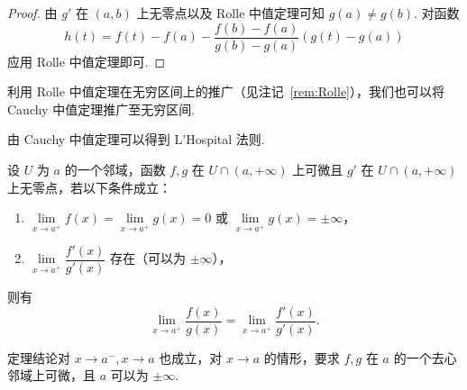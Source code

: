 \documentclass[../main.tex]{subfiles}
\begin{document}
\begin{proof}
    由 $g'$ 在 $(a, b)$ 上无零点以及 Rolle 中值定理可知 $g(a) \neq g(b)$. 对函数
    $$
    h(t) = f(t) - f(a) - \frac{f(b) - f(a)}{g(b) - g(a)} (g(t) - g(a))
    $$
    应用 Rolle 中值定理即可. 
\end{proof}

\begin{remark}
    利用 Rolle 中值定理在无穷区间上的推广（见注记~\ref{rem:Rolle}），我们也可以将 Cauchy 中值定理推广至无穷区间. 
\end{remark}

由 Cauchy 中值定理可以得到 L'Hospital 法则. 

\begin{theorem}[L'Hospital 法则] 
    设 $U$ 为 $a$ 的一个邻域，函数 $f, g$ 在 $U \cap (a, +\infty)$ 上可微且 $g'$ 在 $U \cap (a, +\infty)$ 上无零点，若以下条件成立：
    \begin{enumerate}[label = (\alph*)]
        \item $\lim\limits_{x \to a^+} f(x) = \lim\limits_{x \to a^+} g(x) = 0$ 或 $\lim\limits_{x \to a^+} g(x) = \pm\infty$，
        \item $\lim\limits_{x \to a^+} \dfrac{f'(x)}{g'(x)}$ 存在（可以为 $\pm\infty$），
    \end{enumerate}
    则有
    $$
    \lim_{x \to a^+} \frac{f(x)}{g(x)} = \lim_{x \to a^+} \frac{f'(x)}{g'(x)}. 
    $$
\end{theorem}

\begin{remark}
    定理结论对 $x \to a^-, x \to a$ 也成立，对 $x \to a$ 的情形，要求 $f, g$ 在 $a$ 的一个去心邻域上可微，且 $a$ 可以为 $\pm\infty$. 
\end{remark}
\end{document}
